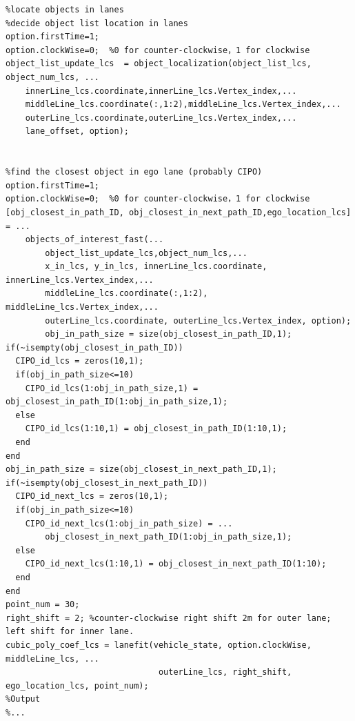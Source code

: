\documentclass[12pt,a4paper]{article}
\begin{document}
\begin{verbatim}
%locate objects in lanes    
%decide object list location in lanes
option.firstTime=1;
option.clockWise=0;  %0 for counter-clockwise，1 for clockwise
object_list_update_lcs  = object_localization(object_list_lcs, object_num_lcs, ...
    innerLine_lcs.coordinate,innerLine_lcs.Vertex_index,...
    middleLine_lcs.coordinate(:,1:2),middleLine_lcs.Vertex_index,...
    outerLine_lcs.coordinate,outerLine_lcs.Vertex_index,...
    lane_offset, option);


%find the closest object in ego lane (probably CIPO)
option.firstTime=1;
option.clockWise=0;  %0 for counter-clockwise，1 for clockwise    
[obj_closest_in_path_ID, obj_closest_in_next_path_ID,ego_location_lcs] = ...
    objects_of_interest_fast(...
        object_list_update_lcs,object_num_lcs,...
        x_in_lcs, y_in_lcs, innerLine_lcs.coordinate, innerLine_lcs.Vertex_index,...
        middleLine_lcs.coordinate(:,1:2), middleLine_lcs.Vertex_index,...
        outerLine_lcs.coordinate, outerLine_lcs.Vertex_index, option);
        obj_in_path_size = size(obj_closest_in_path_ID,1);
if(~isempty(obj_closest_in_path_ID))
  CIPO_id_lcs = zeros(10,1);
  if(obj_in_path_size<=10)
    CIPO_id_lcs(1:obj_in_path_size,1) = obj_closest_in_path_ID(1:obj_in_path_size,1);
  else
    CIPO_id_lcs(1:10,1) = obj_closest_in_path_ID(1:10,1);
  end
end
obj_in_path_size = size(obj_closest_in_next_path_ID,1);
if(~isempty(obj_closest_in_next_path_ID))
  CIPO_id_next_lcs = zeros(10,1);
  if(obj_in_path_size<=10)
    CIPO_id_next_lcs(1:obj_in_path_size) = ...
        obj_closest_in_next_path_ID(1:obj_in_path_size,1);
  else
    CIPO_id_next_lcs(1:10,1) = obj_closest_in_next_path_ID(1:10);
  end
end
point_num = 30;
right_shift = 2; %counter-clockwise right shift 2m for outer lane; left shift for inner lane.
cubic_poly_coef_lcs = lanefit(vehicle_state, option.clockWise, middleLine_lcs, ...
                               outerLine_lcs, right_shift, ego_location_lcs, point_num);
%Output
%...
\end{verbatim}



\clearpage %
\printbibliography[title={参考文献},heading= bibnumbered]
\end{document}
